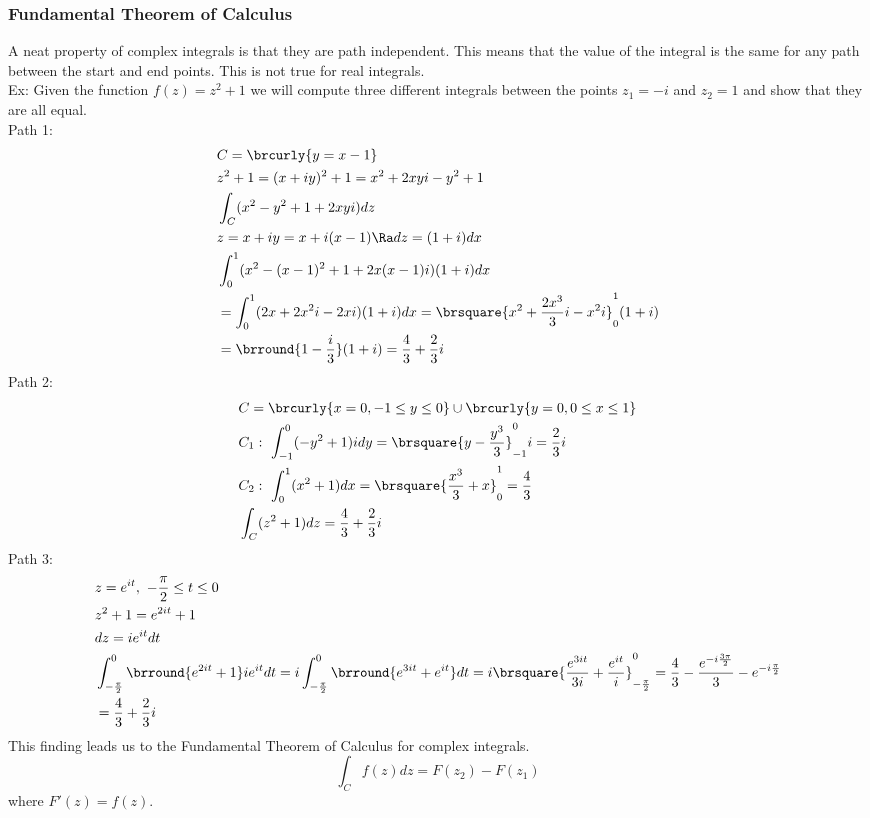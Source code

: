 \subsubsection{Fundamental Theorem of Calculus}
A neat property of complex integrals is that they are path independent. This means that the value of the integral is the same for any path between the start and end points. This is not true for real integrals.\\
Ex: Given the function $f(z)=z^2+1$ we will compute three different integrals between the points $z_1=-i$ and $z_2=1$ and show that they are all equal.\\
Path 1:
\begin{align*}
    &C=\brcurly{y=x-1}\\
    &z^2+1=(x+iy)^2+1=x^2+2xyi-y^2+1\\
    &\int_C(x^2-y^2+1+2xyi)dz\\
    &z=x+iy=x+i(x-1)\Ra dz=(1+i)dx\\
    &\int_0^1(x^2-(x-1)^2+1+2x(x-1)i)(1+i)dx\\
    &=\int_0^1(2x+2x^2i-2xi)(1+i)dx=\brsquare{x^2+\frac{2x^3}{3}i-x^2i}_0^1(1+i)\\
    &=\brround{1-\frac{i}{3}}(1+i)=\frac{4}{3}+\frac{2}{3}i
\end{align*}
Path 2:
\begin{align*}
    &C=\brcurly{x=0,-1\leq y\leq 0}\cup\brcurly{y=0,0\leq x\leq 1}\\
    &C_1:\ \int_{-1}^0(-y^2+1)idy=\brsquare{y-\frac{y^3}{3}}_{-1}^0i=\frac{2}{3}i\\
    &C_2:\ \int_0^1(x^2+1)dx=\brsquare{\frac{x^3}{3}+x}_0^1=\frac{4}{3}\\
    &\int_C(z^2+1)dz=\frac{4}{3}+\frac{2}{3}i
\end{align*}
Path 3:
\begin{align*}
    &z=e^{it},\ -\frac{\pi}{2}\leq t\leq 0\\
    &z^2+1=e^{2it}+1\\
    &dz=ie^{it}dt\\
    &\int_{-\frac{\pi}{2}}^0\brround{e^{2it}+1}ie^{it}dt=i\int_{-\frac{\pi}{2}}^0\brround{e^{3it}+e^{it}}dt=i\brsquare{\frac{e^{3it}}{3i}+\frac{e^{it}}{i}}_{-\frac{\pi}{2}}^0=\frac{4}{3}-\frac{e^{-i\frac{3\pi}{2}}}{3}-e^{-i\frac{\pi}{2}}\\
    &=\frac{4}{3}+\frac{2}{3}i
\end{align*}
This finding leads us to the Fundamental Theorem of Calculus for complex integrals.
$$\int_C f(z)dz=F(z_2)-F(z_1)$$
where $F'(z)=f(z)$.\\
